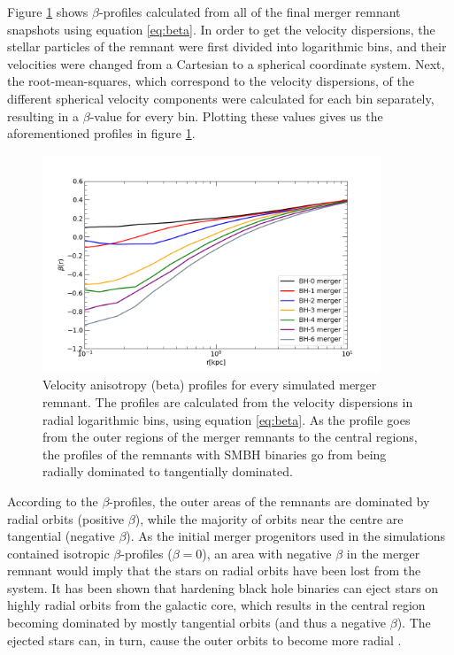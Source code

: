 \documentclass[english, oneside]{HYgradu}
\begin{document}
Figure \ref{figure:beta_no_rb} shows $\beta$-profiles calculated from all of the final merger remnant snapshots using equation \ref{eq:beta}. In order to get the velocity dispersions, the stellar particles of the remnant were first divided into logarithmic bins, and their velocities were changed from a Cartesian to a spherical coordinate system. Next, the root-mean-squares, which correspond to the velocity dispersions, of the different spherical velocity components were calculated for each bin separately, resulting in a $\beta$-value for every bin. Plotting these values gives us the aforementioned profiles in figure \ref{figure:beta_no_rb}. 

\begin{figure}[h]
	\centering
	\includegraphics[width=0.9\textwidth]{beta_no_rb.png}
	\caption{Velocity anisotropy (beta) profiles for every simulated merger remnant. The profiles are calculated from the velocity dispersions in radial logarithmic bins, using equation \ref{eq:beta}. As the profile goes from the outer regions of the merger remnants to the central regions, the profiles of the remnants with SMBH binaries go from being radially dominated to tangentially dominated.}
	\label{figure:beta_no_rb}
\end{figure}

According to the $\beta$-profiles, the outer areas of the remnants are dominated by radial orbits (positive $\beta$), while the majority of orbits near the centre are tangential (negative $\beta$). As the initial merger progenitors used in the simulations contained isotropic $\beta$-profiles ($\beta = 0$), an area with negative $\beta$ in the merger remnant would imply that the stars on radial orbits have been lost from the system. It has been shown that hardening black hole binaries can eject stars on highly radial orbits from the galactic core, which results in the central region becoming dominated by mostly tangential orbits (and thus a negative $\beta$). The ejected stars can, in turn, cause the outer orbits to become more radial \citep{Quinlan1997, Milosavljevic2001, Thomas2014}. 
\end{document}
